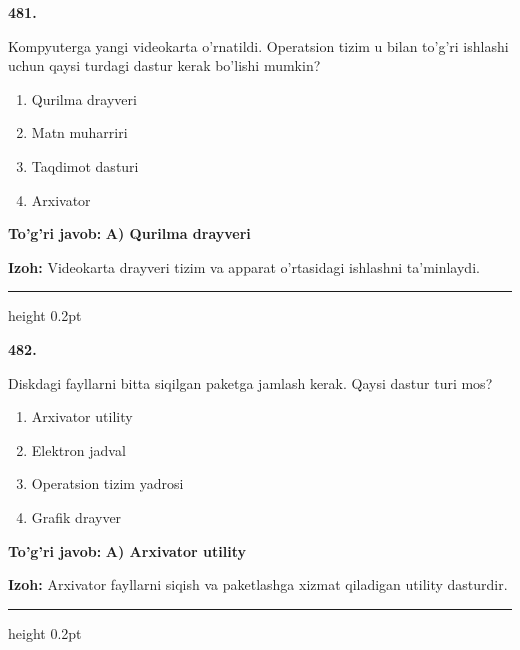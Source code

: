 \documentclass[10pt,a4paper]{article}
\begin{document}
{\bfseries\sffamily\color{ink} 481.}
\par
Kompyuterga yangi videokarta o'rnatildi. Operatsion tizim u bilan to'g'ri ishlashi uchun qaysi turdagi dastur kerak bo'lishi mumkin?
\begin{enumerate}[label=\Alph*),leftmargin=9mm]
\item Qurilma drayveri
\item Matn muharriri
\item Taqdimot dasturi
\item Arxivator
\end{enumerate}
\begin{tcolorbox}[enhanced,breakable,colback=teal!4,colframe=teal!60!black,boxrule=0.45pt,arc=1.2mm,left=2.7mm,right=2.7mm,top=1.8mm,bottom=1.8mm,before skip=2mm,after skip=2mm]
{\bfseries\sffamily\color{teal}To'g'ri javob:} \textbf{A) Qurilma drayveri}
\par\smallskip
{\bfseries Izoh:} Videokarta drayveri tizim va apparat o'rtasidagi ishlashni ta'minlaydi.
\end{tcolorbox}
\vspace{2mm}\hrule height 0.2pt\vspace{3mm}

{\bfseries\sffamily\color{ink} 482.}
\par
Diskdagi fayllarni bitta siqilgan paketga jamlash kerak. Qaysi dastur turi mos?
\begin{enumerate}[label=\Alph*),leftmargin=9mm]
\item Arxivator utility
\item Elektron jadval
\item Operatsion tizim yadrosi
\item Grafik drayver
\end{enumerate}
\begin{tcolorbox}[enhanced,breakable,colback=teal!4,colframe=teal!60!black,boxrule=0.45pt,arc=1.2mm,left=2.7mm,right=2.7mm,top=1.8mm,bottom=1.8mm,before skip=2mm,after skip=2mm]
{\bfseries\sffamily\color{teal}To'g'ri javob:} \textbf{A) Arxivator utility}
\par\smallskip
{\bfseries Izoh:} Arxivator fayllarni siqish va paketlashga xizmat qiladigan utility dasturdir.
\end{tcolorbox}
\vspace{2mm}\hrule height 0.2pt\vspace{3mm}
\end{document}
